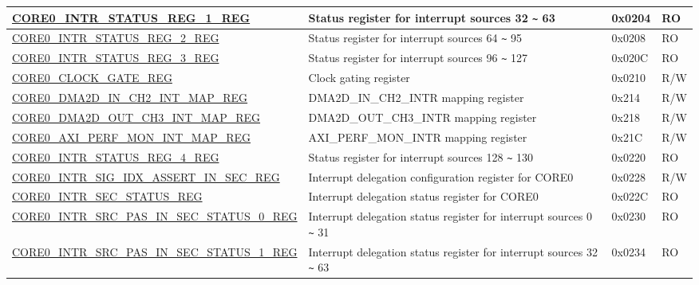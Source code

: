 \begin{longtable}{ | p{7.5cm} | p{7.2cm} | p{1.3cm} | p{1cm} | }
\hyperref[regdesc:CORE0INTRSTATUSREG1REG]{CORE0\_INTR\_STATUS\_REG\_1\_REG} & Status register for interrupt sources 32 \verb+~+ 63  & 0x0204 & RO \\ \hline

\hyperref[regdesc:CORE0INTRSTATUSREG2REG]{CORE0\_INTR\_STATUS\_REG\_2\_REG} & Status register for interrupt sources 64 \verb+~+ 95  & 0x0208 & RO \\ \hline

\hyperref[regdesc:CORE0INTRSTATUSREG3REG]{CORE0\_INTR\_STATUS\_REG\_3\_REG} & Status register for interrupt sources 96 \verb+~+ 127  & 0x020C & RO \\ \hline

\hyperref[regdesc:CORE0CLOCKGATEREG]{CORE0\_CLOCK\_GATE\_REG} & Clock gating register & 0x0210 & R/W \\ \hline


\hyperref[regdesc:CORE0DMA2DINCH2INTMAPREG]{CORE0\_DMA2D\_IN\_CH2\_INT\_MAP\_REG} & DMA2D\_IN\_CH2\_INTR mapping register & 0x214 & R/W \\ \hline

\hyperref[regdesc:CORE0DMA2DOUTCH3INTMAPREG]{CORE0\_DMA2D\_OUT\_CH3\_INT\_MAP\_REG} & DMA2D\_OUT\_CH3\_INTR mapping register & 0x218 & R/W \\ \hline

\hyperref[regdesc:CORE0AXIPERFMONINTMAPREG]{CORE0\_AXI\_PERF\_MON\_INT\_MAP\_REG} & AXI\_PERF\_MON\_INTR mapping register & 0x21C & R/W \\ \hline

\hyperref[regdesc:CORE0INTRSTATUSREG4REG]{CORE0\_INTR\_STATUS\_REG\_4\_REG} & Status register for interrupt sources 128 \verb+~+ 130  & 0x0220 & RO \\ \hline

\hyperref[regdesc:CORE0INTRSIGIDXASSERTINSECREG]{CORE0\_INTR\_SIG\_IDX\_ASSERT\_IN\_SEC\_REG} & Interrupt delegation configuration register for CORE0  & 0x0228 & R/W \\ \hline

\hyperref[regdesc:CORE0INTRSECSTATUSREG]{CORE0\_INTR\_SEC\_STATUS\_REG} & Interrupt delegation status register for CORE0 & 0x022C & RO \\ \hline

\hyperref[regdesc:CORE0INTRSRCPASSINSECSTATUS0REG]{CORE0\_INTR\_SRC\_PAS\_IN\_SEC\_STATUS\_0\_REG} & Interrupt delegation status register for interrupt sources 0 \verb+~+ 31  & 0x0230 & RO \\ \hline

\hyperref[regdesc:CORE0INTRSRCPASSINSECSTATUS1REG]{CORE0\_INTR\_SRC\_PAS\_IN\_SEC\_STATUS\_1\_REG} & Interrupt delegation status register for interrupt sources 32 \verb+~+ 63  & 0x0234 & RO \\ \hline


\end{longtable}
